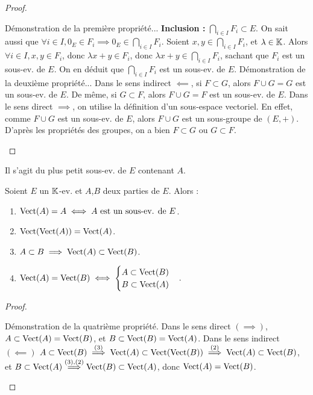 \documentclass[12pt,a4paper]{report}
\begin{document}
\begin{proof}
    \begin{outline}
        \1 Démonstration de la première propriété...
            \2 \textbf{Inclusion : } $\bigcap_{i \in I} F_i \subset E$.
            \2 On sait aussi que $\forall i \in I, 0_E \in F_i \implies 0_E \in \bigcap_{i\in I} F_i$.
            \2 Soient $x,y \in \bigcap_{i\in I} F_i$, et $\lambda \in \mathbb{K}$. Alors $\forall i \in I, x,y \in F_i$, donc $\lambda x + y \in F_i$, donc $\lambda x + y \in \bigcap_{i\in I} F_i$, sachant que $F_i$ est un sous-ev. de $E$.
            \2 On en déduit que $\bigcap_{i\in I} F_i$ est un sous-ev. de $E$.
        \1 Démonstration de la deuxième propriété...
            \2 Dans le sens indirect $\impliedby$, si $F \subset G$, alors $F \cup G = G$ est un sous-ev. de $E$. De même, si $G \subset F$, alors $F \cup G = F$ est un sous-ev. de $E$.
            \2 Dans le sens direct $\implies$, on utilise la définition d'un sous-espace vectoriel.
            \2 En effet, comme $F \cup G$ est un sous-ev. de $E$, alors $F \cup G$ est un sous-groupe de $(E,+)$.
            \2 D'après les propriétés des groupes, on a bien $F \subset G$ ou $G \subset F$.
    \end{outline}
\end{proof}

\begin{property}
    Il s'agit du plus petit sous-ev. de $E$ contenant $A$.
\end{property}

\begin{property}
    Soient $E$ un $\mathbb{K}$-ev. et $A$,$B$ deux parties de $E$. Alors :
    \begin{enumerate}
        \item $\mathrm{Vect}(A) = A \iff A \text{ est un sous-ev. de } E$.
        \item $\mathrm{Vect}(\mathrm{Vect}(A)) = \mathrm{Vect}(A)$.
        \item $A \subset B \implies \mathrm{Vect}(A) \subset \mathrm{Vect}(B)$.
        \item $\mathrm{Vect}(A) = \mathrm{Vect}(B) \iff \begin{cases}
        A \subset \mathrm{Vect}(B)\\
        B \subset \mathrm{Vect}(A)
        \end{cases}$.
    \end{enumerate}
\end{property}

\begin{proof}
    \begin{outline}
        \1 Démonstration de la quatrième propriété.
            \2 Dans le sens direct $(\implies)$, $A \subset \mathrm{Vect}(A) = \mathrm{Vect}(B)$, et $B \subset \mathrm{Vect}(B) = \mathrm{Vect}(A)$.
            \2 Dans le sens indirect $(\impliedby)$
                \3 $A \subset \mathrm{Vect}(B) \overset{\text{(3)}}\implies \mathrm{Vect}(A) \subset \mathrm{Vect}(\mathrm{Vect}(B)) \overset{\text{(2)}}\implies \mathrm{Vect}(A) \subset \mathrm{Vect}(B)$,
                \3 et $B \subset \mathrm{Vect}(A) \overset{\text{(3),(2)}}\implies \mathrm{Vect}(B) \subset \mathrm{Vect}(A)$, donc $\mathrm{Vect}(A) = \mathrm{Vect}(B)$.
    \end{outline}
\end{proof}
\end{document}
